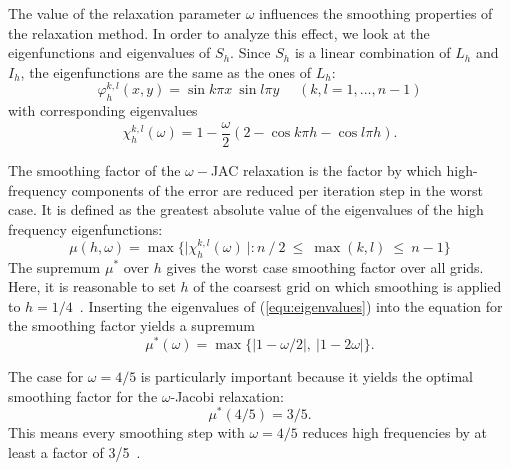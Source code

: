The value of the relaxation parameter $\omega$ influences the smoothing properties of the relaxation method. In order to analyze this effect, we look at the eigenfunctions and eigenvalues of $S_h$. Since $S_h$ is a linear combination of $L_h$ and $I_h$, the eigenfunctions are the same as the ones of $L_h$:
\begin{equation}
\varphi_h ^{k,l}(x,y) = \sin k \pi x~ \sin l \pi y \text{~~~~}(k,l = 1, \hdots, n-1)
\end{equation}
with corresponding eigenvalues 
\begin{equation}
\chi_h^{k,l}(\omega) = 1- \frac{\omega}{2}(2-\cos k \pi h - \cos l \pi h).
\label{equ:eigenvalues}
\end{equation}

The smoothing factor of the $\omega-$JAC relaxation is the factor by which high-frequency components of the error are reduced per iteration step in the worst case. It is defined as the greatest absolute value of the eigenvalues of the high frequency eigenfunctions:
\begin{equation}
\mu (h,\omega) = \max \Big\{\Big|\chi_h^{k,l}(\omega)~\Big|: n~/~2 ~\leq ~\max(k,l) ~\leq ~n-1 \Big\} 
\end{equation}
The supremum $\mu^*$ over $h$  gives the worst case smoothing factor over all grids. Here, it is reasonable to set $h$ of the coarsest grid on which smoothing is applied to $h = 1/4$~\cite{Trottenberg:2000:MUL:374106}. Inserting the eigenvalues of (\ref{equ:eigenvalues}) into the equation for the smoothing factor yields a supremum 
\begin{equation}
\mu^* (\omega) = \max \big\{\big|1-\omega/2\big|,~\big|1-2\omega\big| \big\}.
\end{equation}


The case for $\omega = 4/5$ is particularly important because it yields the optimal smoothing factor for the $\omega$-Jacobi relaxation:
\begin{equation}
\mu^*(4/5) = 3/5.
\end{equation}
This means every smoothing step with $\omega = 4/5$ reduces high frequencies by at least a factor of 3/5~\cite{Trottenberg:2000:MUL:374106}.

